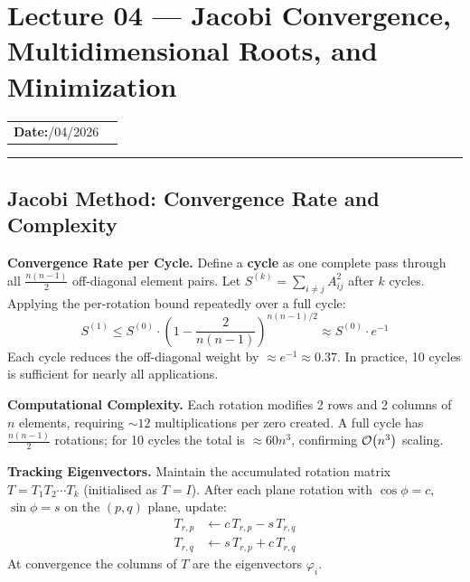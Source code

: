 
\section{Lecture 04 — Jacobi Convergence, Multidimensional Roots, and
  Minimization}\label{sec:lec04}

\begin{center}
\begin{tabular}{ll}
  \textbf{Date:}\quad 26/04/2026 & \\
\end{tabular}
\end{center}
\hrule\vspace{1.5em}

\subsection{Jacobi Method: Convergence Rate and Complexity}

\textbf{Convergence Rate per Cycle.} Define a \textbf{cycle} as one complete
pass through all $\frac{n(n-1)}{2}$ off-diagonal element pairs. Let
$S^{(k)} = \sum_{i \neq j} A_{ij}^2$ after $k$ cycles. Applying the
per-rotation bound repeatedly over a full cycle:
\begin{equation}
S^{(1)} \leq S^{(0)} \cdot \left(1 - \frac{2}{n(n-1)}\right)^{n(n-1)/2}
\approx S^{(0)} \cdot e^{-1}
\end{equation}
Each cycle reduces the off-diagonal weight by $\approx e^{-1} \approx 0.37$.
In practice, 10 cycles is sufficient for nearly all applications.

\textbf{Computational Complexity.} Each rotation modifies 2 rows and 2
columns of $n$ elements, requiring $\sim 12$ multiplications per zero
created. A full cycle has $\frac{n(n-1)}{2}$ rotations; for 10 cycles the
total is $\approx 60n^3$, confirming $\mathcal{O}\!\left(n^3\right)$ scaling.

\textbf{Tracking Eigenvectors.} Maintain the accumulated rotation matrix
$T = T_1 T_2 \cdots T_k$ (initialised as $T = I$). After each plane rotation
with $\cos\phi = c$, $\sin\phi = s$ on the $(p,q)$ plane, update:
\begin{align}
T_{r,p} &\leftarrow c\, T_{r,p} - s\, T_{r,q} \\
T_{r,q} &\leftarrow s\, T_{r,p} + c\, T_{r,q}
\end{align}
At convergence the columns of $T$ are the eigenvectors $\varphi_i$.

